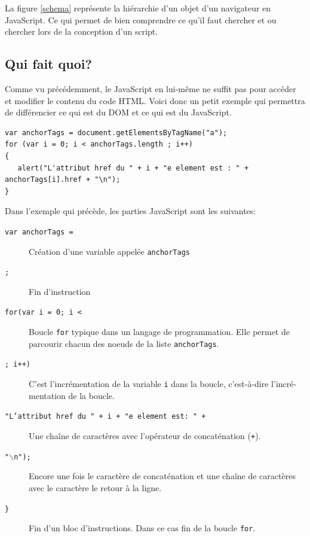 \documentclass[10pt,a4paper,titlepage]{article}
\begin{document}
La figure \ref{schema} représente la hiérarchie d'un objet d'un navigateur en JavaScript. Ce qui permet de bien comprendre ce qu'il faut chercher et ou chercher lors de la conception d'un script.

\subsection{Qui fait quoi?}
% 
Comme vu précédemment, le JavaScript en lui-même ne suffit pas pour accéder et modifier le contenu du code HTML. Voici donc un petit exemple qui permettra de différencier ce qui est du DOM et ce qui est du JavaScript.

\begin{lstlisting}
var anchorTags = document.getElementsByTagName("a");
for (var i = 0; i < anchorTags.length ; i++)
{
   alert("L'attribut href du " + i + "e element est : " + anchorTags[i].href + "\n");
}	
\end{lstlisting}

Dans l'exemple qui précède, les parties JavaScript sont les suivantes:
\begin{description}
	\item [\texttt{var anchorTags =}] {Création d'une variable appelée \texttt{anchorTags}}
	\item [\texttt{;}] {Fin d'instruction}
	\item [\texttt{for(var i = 0; i < }] {Boucle \texttt{for} typique dans un langage de programmation. Elle permet de parcourir chacun des noeuds de la liste \texttt{anchorTags}.}
	\item [\texttt{; i++)}] {C'est l'incrémentation de la variable \texttt{i} dans la boucle, c'est-à-dire l'incré-mentation de la boucle.}
	\item [\texttt{"L'attribut href du " + i + "e element est: " +}] {Une chaîne de caractères avec l'opérateur de concaténation (\texttt{+}).}
	\item [\texttt{"$\backslash$n");}] {Encore une fois le caractère de concaténation et une chaîne de caractères avec le caractère le retour à la ligne.}
	\item [\texttt{\}}] {Fin d'un bloc d'instructions. Dans ce cas fin de la boucle \texttt{for}.}
\end{description}
\end{document}
